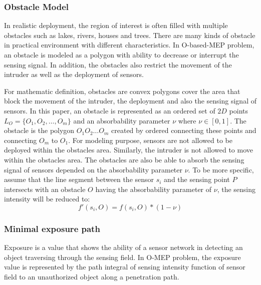 \documentclass[final]{elsarticle}
\begin{document}
\subsubsection{Obstacle Model}
In realistic deployment, the region of interest is often filled with multiple obstacles such as lakes, rivers, houses and trees. There are many kinds of obstacle in practical environment with different characteristics. In O-based-MEP problem, an obstacle is modeled as a polygon with ability to decrease or interrupt the sensing signal. In addition, the obstacles also restrict the movement of the intruder as well as the deployment of sensors. 

For mathematic definition, obstacles are convex polygons cover the area that block the movement of the intruder, the deployment and also the sensing signal of sensors. In this paper, an obstacle is represented as an ordered set of $2D$ points $ L_O = \{O_1, O_2,\ldots,O_m\}$ and an absorbability parameter $\nu$ where $\nu \in [0,1]$. The obstacle is the polygon $O_1 O_2\ldots O_m $ created by ordered connecting these points and connecting $O_m$ to $O_1$. For modeling purpose, sensors are not allowed to be deployed within the obstacles area. Similarly, the intruder is not allowed to move within the obstacles area. The obstacles are also be able to absorb the sensing signal of sensors depended on the absorbability parameter $\nu$. To be more specific, assume that the line segment between the sensor $s_i$ and the sensing point $ P $ intersects with an obstacle $O$ having the absorbability parameter of $\nu$, the sensing intensity will be reduced to: 
\begin{equation}
\label{eqob}
f'(s_i,O) = f(s_i,O) * (1-\nu)
\end{equation}
\subsubsection{Minimal exposure path}
Exposure is a value that shows the ability of a sensor network in detecting an object traversing through the sensing field. In O-MEP problem, the exposure value is represented by the path integral of sensing intensity function of sensor field to an unauthorized object along a penetration path. 
\end{document}
